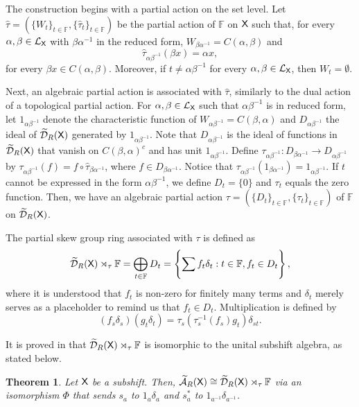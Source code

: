 \documentclass[a4paper,12pt]{amsart}
\newtheorem{theorem}[equation]{Theorem}
\theoremstyle{definition}
\theoremstyle{remark}
\numberwithin{equation}{section}
\newcommand{\osf}{{\normalfont \textsf{X}}}
\newcommand{\lang}{\CL_{\osf}}
\newcommand{\ualgshift}{\TCA_R(\osf)}
\newcommand{\udalgshift}{\TCD_R(\osf)}
\newcommand{\F}{\mathbb{F}}
\newcommand{\CA}{\mathcal{A}}
\newcommand{\CD}{\mathcal{D}}
\newcommand{\CL}{\mathcal{L}}
\newcommand{\TCA}{\widetilde{\CA}}
\newcommand{\TCD}{\widetilde{\CD}}
\newcommand{\tauh}{\widehat{\tau}}
\begin{document}
The construction begins with a partial action on the set level. Let $\tauh=\left(\{W_t\}_{t\in\F},\{\tauh_t\}_{t\in\F}  \right)$ be the partial action of $\F$ on $\osf$ such that, for every $\alpha,\beta\in\lang$ with $\beta\alpha^{-1}$ in the reduced form, $W_{\beta\alpha^{-1}} = C(\alpha,\beta)$ and
\[\tauh_{\alpha\beta^{-1}}(\beta x)=\alpha x,\]
for every $\beta x\in C(\alpha,\beta)$. Moreover, if $t\neq \alpha\beta^{-1}$ for every $\alpha,\beta\in\lang$, then $W_t=\emptyset$.

Next, an algebraic partial action is associated with $\tauh$, similarly to the dual action of a topological partial action. For $\alpha,\beta\in \lang$ such that $\alpha\beta^{-1}$ is in reduced form, let $1_{\alpha\beta^{-1}}$ denote the characteristic function of $W_{\alpha\beta^{-1}}=C(\beta,\alpha)$ and $D_{\alpha\beta^{-1}}$ the ideal of $\udalgshift$ generated by $1_{\alpha\beta^{-1}}$. Note that $D_{\alpha\beta^{-1}}$ is the ideal of functions in $\udalgshift$ that vanish on $C(\beta,\alpha)^c$ and has unit $1_{\alpha\beta^{-1}}$. Define $\tau_{\alpha\beta^{-1}}:D_{\beta\alpha^{-1}}\to D_{\alpha\beta^{-1}}$ by $\tau_{\alpha\beta^{-1}}(f)=f\circ\tauh_{\beta\alpha^{-1}}$, where $f\in D_{\beta\alpha^{-1}}$. Notice that $\tau_{\alpha\beta^{ -1}}(1_{\beta\alpha^{-1}})=1_{\alpha\beta^{-1}}$. If $t$ cannot be expressed in the form $\alpha\beta^{-1}$, we define $D_t=\{0\}$ and $\tau_t$ equals the zero function. Then, we have an algebraic partial action $\tau=\left( \{D_t\}_{t\in \F}, \{\tau_t\}_{t\in\F} \right)$  of $\F$ on $\udalgshift$.

The partial skew group ring associated with $\tau$ is defined as 
\[\udalgshift\rtimes_{\tau}\F= \bigoplus_{t\in\F} D_t=\left\{\sum_{} f_t\delta_t: t\in \F, f_t\in D_t \right\}, \]
where it is understood that $f_t$ is non-zero for finitely many terms and $\delta_t$ merely serves as a placeholder to remind us that $f_t\in D_t$. Multiplication is defined by 
\begin{equation}\label{eq:partial_multiplication}
    (f_s\delta_s)(g_t\delta_t) = \tau_s(\tau_s^{-1}(f_s)g_t )\delta_{st}.
\end{equation}

It is proved in \cite[Theorem 5.9]{BGGV} that $\udalgshift\rtimes_{\tau}\F$ is isomorphic to the unital subshift algebra, as stated below. 

\begin{theorem}\label{thm:set-theoretic-partial-action}
Let $\osf$ be a subshift. Then, $\ualgshift\cong\udalgshift\rtimes_{\tau}\F$ via an isomorphism $\Phi$ that sends $s_a$ to $1_a\delta_a$ and $s^*_a$ to $1_{a^{-1}}\delta_{a^{-1}}$.
\end{theorem}
\end{document}
